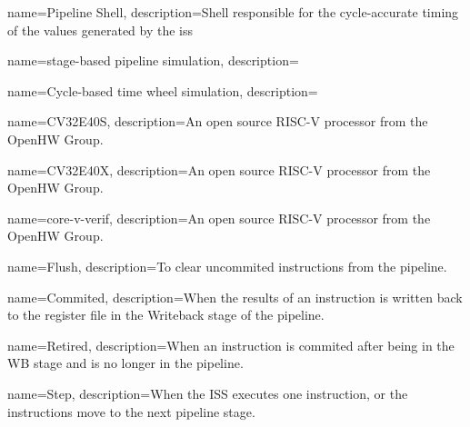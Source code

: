 

\makeglossaries %


{
    name=Pipeline Shell,
    description=Shell responsible for the cycle-accurate timing of the values generated by the \acrshort{iss}
}

{
    name=stage-based pipeline simulation,
    description=
}

{
    name=Cycle-based time wheel simulation,
    description=
}

{
    name=CV32E40S,
    description=An open source RISC-V processor from the OpenHW Group.
}

{
    name=CV32E40X,
    description=An open source RISC-V processor from the OpenHW Group.
}

{
    name=core-v-verif,
    description=An open source RISC-V processor from the OpenHW Group.
}


{
    name=Flush,
    description=To clear uncommited instructions from the pipeline. 
}

{
    name=Commited,
    description=When the results of an instruction is written back to the register file in the Writeback stage of the pipeline.
}

{
    name=Retired,
    description=When an instruction is \gls{commited} after being in the WB stage and is no longer in the pipeline.
}

{
    name=Step,
    description=When the ISS executes one instruction, or the instructions move to the next pipeline stage.
}



